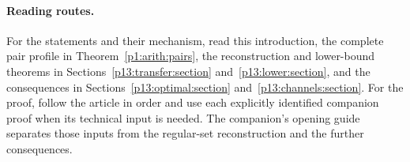 \paragraph{Reading routes.}
For the statements and their mechanism, read this introduction,
the complete pair profile in Theorem~\ref{p1:arith:pairs},
the reconstruction and lower-bound theorems in
Sections~\ref{p13:transfer:section} and~\ref{p13:lower:section},
and the consequences in Sections~\ref{p13:optimal:section}
and~\ref{p13:channels:section}.
For the proof, follow the article in order and use each explicitly
identified companion proof when its technical input is needed.
The companion's opening guide separates those inputs from the
regular-set reconstruction and the further consequences.

